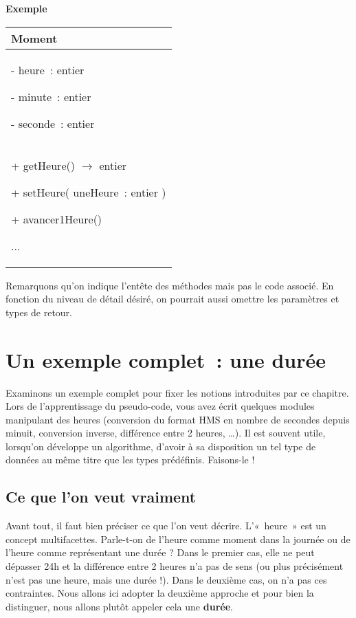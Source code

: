 	\textbf{Exemple}
	
	\begin{center}
	\begin{tabular}{|m{7cm}|}
	\hline
	\centering\arraybslash \bfseries Moment\\\hline
	{ {}- heure~: entier}
	
	{ {}- minute~: entier}
	
	 {}- seconde~: entier\\\hline
	{ + getHeure() \textsf{$\rightarrow$} entier}
	
	{ + setHeure( uneHeure~: entier )}
	
	{ + avancer1Heure()}
	
	 ...\\\hline
	\end{tabular}
	\end{center}

	Remarquons qu'on indique l'entête des méthodes mais
	pas le code associé. En fonction du niveau de détail désiré, on
	pourrait aussi omettre les paramètres et types de retour.

\section{Un exemple complet~: une durée}

	Examinons un exemple complet pour fixer les notions introduites par ce
	chapitre. Lors de l'apprentissage du pseudo-code, vous
	avez écrit quelques modules manipulant des heures (conversion du format
	HMS en nombre de secondes depuis minuit, conversion inverse, différence
	entre 2 heures, …). Il est souvent utile, lorsqu’on développe un
	algorithme, d’avoir à sa disposition un tel type de données au même
	titre que les types prédéfinis. Faisons-le !
	
	\subsection{Ce que l’on veut vraiment}
	
		Avant tout, il faut bien préciser ce que l’on veut décrire. L’«~heure~»
		est un concept multifacettes. Parle-t-on de l’heure comme moment dans
		la journée ou de l’heure comme représentant une durée ? Dans le premier
		cas, elle ne peut dépasser 24h et la différence entre 2 heures n’a pas
		de sens (ou plus précisément n’est pas une heure, mais une durée !).
		Dans le deuxième cas, on n’a pas ces contraintes. Nous allons ici
		adopter la deuxième approche et pour bien la distinguer, nous allons
		plutôt appeler cela une \textbf{durée}.
	
